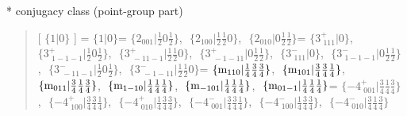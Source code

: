 \documentclass[fleqn,10pt,landscape]{jsarticle}
\begin{document}
* conjugacy class (point-group part)
\begin{quote}
[ $\{1|0\}$ ] = \quad $\{1|0\}$ = \quad $\{2{}_{001}|\frac{1}{2} 0 \frac{1}{2}\}$,\,\, $\{2{}_{100}|\frac{1}{2} \frac{1}{2} 0\}$,\,\, $\{2{}_{010}|0 \frac{1}{2} \frac{1}{2}\}$\newline[ $\{3^{+}_{\,\,111}|0\}$ ] = \quad $\{3^{+}_{\,\,111}|0\}$,\,\, $\{3^{+}_{\,\,1-1-1}|\frac{1}{2} 0 \frac{1}{2}\}$,\,\, $\{3^{+}_{\,\,-11-1}|\frac{1}{2} \frac{1}{2} 0\}$,\,\, $\{3^{+}_{\,\,-1-11}|0 \frac{1}{2} \frac{1}{2}\}$,\,\, $\{3^{-}_{\,\,111}|0\}$,\,\, $\{3^{-}_{\,\,1-1-1}|0 \frac{1}{2} \frac{1}{2}\}$,\,\, $\{3^{-}_{\,\,-11-1}|\frac{1}{2} 0 \frac{1}{2}\}$,\,\, $\{3^{-}_{\,\,-1-11}|\frac{1}{2} \frac{1}{2} 0\}$ = \quad $\{{\rm m}_{110}|\frac{1}{4} \frac{3}{4} \frac{3}{4}\}$,\,\, $\{{\rm m}_{101}|\frac{3}{4} \frac{3}{4} \frac{1}{4}\}$,\,\, $\{{\rm m}_{011}|\frac{3}{4} \frac{1}{4} \frac{3}{4}\}$,\,\, $\{{\rm m}_{1-10}|\frac{1}{4} \frac{1}{4} \frac{1}{4}\}$,\,\, $\{{\rm m}_{-101}|\frac{1}{4} \frac{1}{4} \frac{1}{4}\}$,\,\, $\{{\rm m}_{01-1}|\frac{1}{4} \frac{1}{4} \frac{1}{4}\}$ = \quad $\{-4^{+}_{\,\,001}|\frac{3}{4} \frac{1}{4} \frac{3}{4}\}$,\,\, $\{-4^{+}_{\,\,100}|\frac{3}{4} \frac{3}{4} \frac{1}{4}\}$,\,\, $\{-4^{+}_{\,\,010}|\frac{1}{4} \frac{3}{4} \frac{3}{4}\}$,\,\, $\{-4^{-}_{\,\,001}|\frac{3}{4} \frac{3}{4} \frac{1}{4}\}$,\,\, $\{-4^{-}_{\,\,100}|\frac{1}{4} \frac{3}{4} \frac{3}{4}\}$,\,\, $\{-4^{-}_{\,\,010}|\frac{3}{4} \frac{1}{4} \frac{3}{4}\}$\newline
\end{quote}
\end{document}
